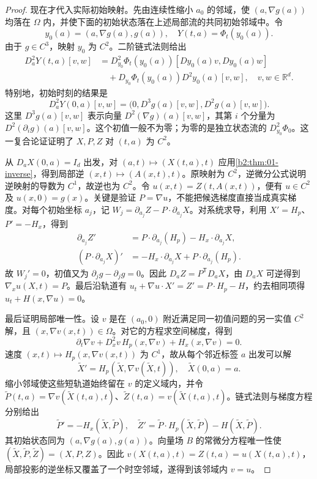 \begin{proof}
现在才代入实际初始映射。先由连续性缩小 \(a_0\) 的邻域，使 \((a,\nabla g(a))\) 均落在 \(\Omega\) 内，并使下面的初始状态落在上述局部流的共同初始邻域中。令
\[
 y_0(a)=(a,\nabla g(a),g(a)),\quad
 Y(t,a)=\Phi_t(y_0(a)).
\]
由于 \(g\in C^3\)，映射 \(y_0\) 为 \(C^2\)。二阶链式法则给出
\[
 \begin{aligned}
 D_a^2Y(t,a)[v,w]
 &=D_{y_0}^2\Phi_t(y_0(a))[Dy_0(a)v,Dy_0(a)w]\\
 &\quad+D_{y_0}\Phi_t(y_0(a))D^2y_0(a)[v,w],
 \quad v,w\in\mathbb R^d.
 \end{aligned}
\]
特别地，初始时刻的结果是
\[
 D_a^2Y(0,a)[v,w]
 =\bigl(0,D^3g(a)[v,w],D^2g(a)[v,w]\bigr).
\]
这里 \(D^3g(a)[v,w]\) 表示向量 \(D^2(\nabla g)(a)[v,w]\)，其第 \(i\) 个分量为 \(D^2(\partial_i g)(a)[v,w]\)。这个初值一般不为零；为零的是独立状态流的 \(D_{y_0}^2\Phi_0\)。这一复合论证证明了 \(X,P,Z\) 对 \((t,a)\) 为 \(C^2\)。

从 \(D_aX(0,a)=I_d\) 出发，对 \((a,t)\mapsto(X(t,a),t)\) 应用\cref{b2:thm:01-inverse}，得到局部逆 \((x,t)\mapsto(A(x,t),t)\)。原映射为 \(C^2\)，逆微分公式说明逆映射的导数为 \(C^1\)，故逆也为 \(C^2\)。令 \(u(x,t)=Z(t,A(x,t))\)，便有 \(u\in C^2\) 及 \(u(x,0)=g(x)\)。关键是验证 \(P=\nabla u\)，不能把候选梯度直接当成真实梯度。对每个初始坐标 \(a_j\)，记
\(W_j=\partial_{a_j}Z-P\cdot\partial_{a_j}X\)。对系统求导，利用 \(X'=H_p\)、\(P'=-H_x\)，得到
\[
 \begin{aligned}
 \partial_{a_j}Z'
 &=P\cdot\partial_{a_j}(H_p)-H_x\cdot\partial_{a_j}X,\\
 (P\cdot\partial_{a_j}X)'
 &=-H_x\cdot\partial_{a_j}X+P\cdot\partial_{a_j}(H_p).
 \end{aligned}
\]
故 \(W_j'=0\)，初值又为 \(\partial_jg-\partial_jg=0\)。因此 \(D_aZ=P^{\mathsf T}D_aX\)，由 \(D_aX\) 可逆得到 \(\nabla_xu(X,t)=P\)。最后沿轨道有
\(u_t+\nabla u\cdot X'=Z'=P\cdot H_p-H\)，约去相同项得 \(u_t+H(x,\nabla u)=0\)。

最后证明局部唯一性。设 \(v\) 是在 \((a_0,0)\) 附近满足同一初值问题的另一实值 \(C^2\) 解，且 \((x,\nabla v(x,t))\in\Omega\)。对它的方程求空间梯度，得到
\[
 \partial_t\nabla v+D_x^2v\,H_p(x,\nabla v)+H_x(x,\nabla v)=0.
\]
速度 \((x,t)\mapsto H_p(x,\nabla v(x,t))\) 为 \(C^1\)，故从每个邻近标签 \(a\) 出发可以解
\[
 \widetilde X'=H_p(\widetilde X,\nabla v(\widetilde X,t)),
 \quad \widetilde X(0,a)=a.
\]
缩小邻域使这些短轨道始终留在 \(v\) 的定义域内，并令 \(\widetilde P(t,a)=\nabla v(\widetilde X(t,a),t)\)、\(\widetilde Z(t,a)=v(\widetilde X(t,a),t)\)。链式法则与梯度方程分别给出
\[
 \widetilde P'=-H_x(\widetilde X,\widetilde P),\quad
 \widetilde Z'=\widetilde P\cdot H_p(\widetilde X,\widetilde P)
                    -H(\widetilde X,\widetilde P).
\]
其初始状态同为 \((a,\nabla g(a),g(a))\)。向量场 \(B\) 的常微分方程唯一性使 \((\widetilde X,\widetilde P,\widetilde Z)=(X,P,Z)\)。因此 \(v(X(t,a),t)=Z(t,a)=u(X(t,a),t)\)，局部投影的逆坐标又覆盖了一个时空邻域，遂得到该邻域内 \(v=u\)。
\end{proof}

